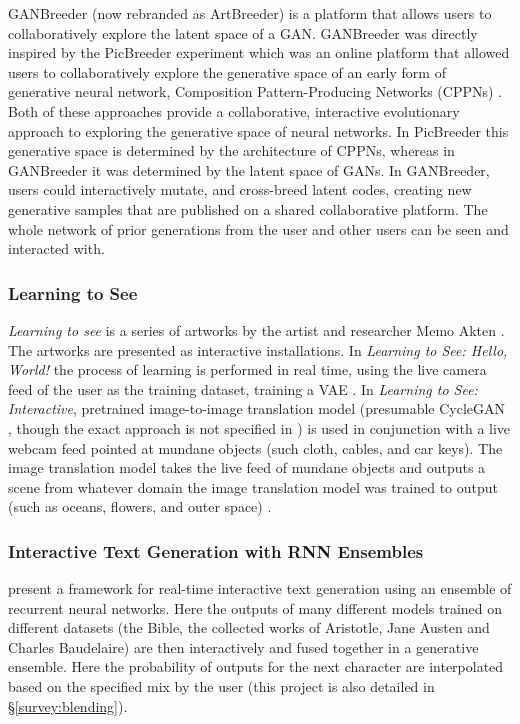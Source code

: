 GANBreeder (now rebranded as ArtBreeder) \citep{simon2020artbreeder} is a platform that allows users to collaboratively explore the latent space of a GAN.
GANBreeder was directly inspired by the PicBreeder experiment \citep{secretan2008picbreeder,secretan2011picbreeder} which was an online platform that allowed users to collaboratively explore the generative space of an early form of generative neural network, Composition Pattern-Producing Networks (CPPNs) \citep{stanley2007compositional}.
Both of these approaches provide a collaborative, interactive evolutionary approach to exploring the generative space of neural networks. 
In PicBreeder this generative space is determined by the architecture of CPPNs, whereas in GANBreeder it was determined by the latent space of GANs.
In GANBreeder, users could interactively mutate, and cross-breed latent codes, creating new generative samples that are published on a shared collaborative platform.
The whole network of prior generations from the user and other users can be seen and interacted with.

\subsubsection{Learning to See}

\textit{Learning to see} is a series of artworks by the artist and researcher Memo Akten \citep{akten2019learning, celis2021memo}.
The artworks are presented as interactive installations.
In \textit{Learning to See: Hello, World!} the process of learning is performed in real time, using the live camera feed of the user as the training dataset, training a VAE \citep{akten2017hello}.
In \textit{Learning to See: Interactive}, pretrained image-to-image translation model (presumable CycleGAN \citep{zhu2017unpaired}, though the exact approach is not specified in \cite{akten2019learning}) is used in conjunction with a live webcam feed pointed at mundane objects (such cloth, cables, and car keys).
The image translation model takes the live feed of mundane objects and outputs a scene from whatever domain the image translation model was trained to output (such as oceans, flowers, and outer space) \citep{akten2017interactive}.

\subsubsection{Interactive Text Generation with RNN Ensembles}

\cite{akten2016real} present a framework for real-time interactive text generation using an ensemble of recurrent neural networks. 
Here the outputs of many different models trained on different datasets (the Bible, the collected works of Aristotle, Jane Austen and Charles Baudelaire) are then interactively and fused together in a generative ensemble.
Here the probability of outputs for the next character are interpolated based on the specified mix by the user (this project is also detailed in \S \ref{survey:blending}).

